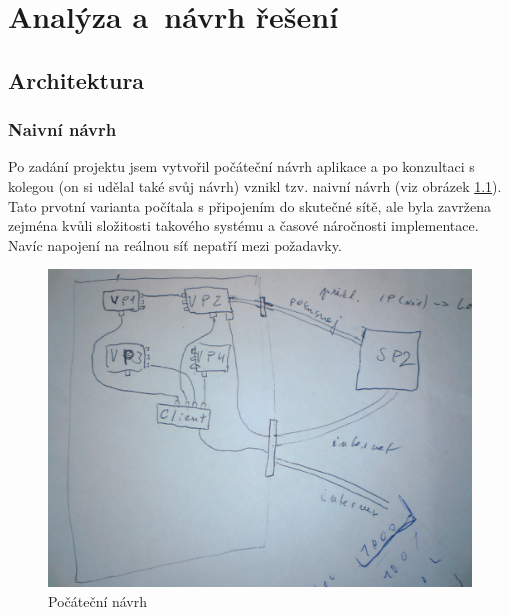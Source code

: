 \chapter{Analýza a~návrh řešení}\label{kap:analyza}






\section{Architektura}

\subsection{Naivní návrh}
Po zadání projektu jsem vytvořil počáteční návrh aplikace a po konzultaci s kolegou (on si udělal také svůj návrh) vznikl tzv. naivní návrh (viz obrázek \ref{fig:navrh}). Tato prvotní varianta počítala s připojením do skutečné sítě, ale byla zavržena zejména kvůli složitosti takového systému a časové náročnosti implementace. Navíc napojení na reálnou síť nepatří mezi požadavky.

\begin{figure}[h]
\begin{center}
\includegraphics[width=12cm]{figures/navrh}
\caption{Počáteční návrh}
\label{fig:navrh}
\end{center}
\end{figure}

